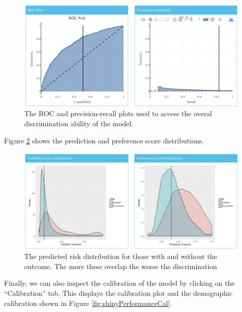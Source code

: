 \documentclass[11pt]{book}
\theoremstyle{definition}
\theoremstyle{definition}
\theoremstyle{definition}
\theoremstyle{remark}
\begin{document}
\begin{figure}

{\centering \includegraphics[width=1\linewidth]{images/PatientLevelPrediction/shiny/shinyPerformanceDisc} 

}

\caption{The ROC and precision-recall plots used to access the overal discrimination ability of the model.}\label{fig:shinyPerformanceDisc}
\end{figure}

Figure \ref{fig:shinyPerformanceDist} shows the prediction and
preference score distributions.

\begin{figure}

{\centering \includegraphics[width=1\linewidth]{images/PatientLevelPrediction/shiny/shinyPerformanceDist} 

}

\caption{The predicted risk distribution for those with and without the outcome. The more these overlap the worse the discrimination}\label{fig:shinyPerformanceDist}
\end{figure}

Finally, we can also inspect the calibration of the model by clicking on
the ``Calibration'' tab. This displays the calibration plot and the
demographic calibration shown in Figure \ref{fig:shinyPerformanceCal}.
\end{document}
